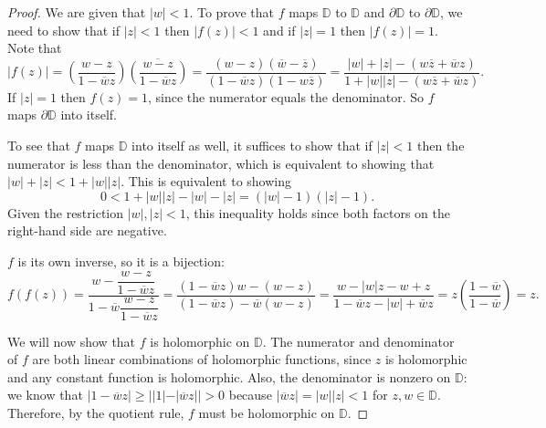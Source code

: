 \documentclass[10pt]{article}
\newcommand{\D}{\mathbb{D}}
\renewcommand{\bar}{\overline}
\begin{document}
\begin{proof}
We are given that $|w| < 1$.  To prove that $f$ maps $\D$ to $\D$ and $\partial \D$ to $\partial \D$, we need to show that if $|z| < 1$ then $|f(z)| < 1$ and if $|z| = 1$ then $|f(z)|=1$.  Note that
$$
|f(z)|
=
\left( \frac{w-z}{1-\bar{w}z} \right) \bar{\left(\frac{w-z}{1-\bar{w}z}\right)}
=
\frac{(w-z)(\bar{w} - \bar{z})}{(1-\bar{w}z)(1-w\bar{z})} = \frac{|w| + |z| - (w\bar{z} + \bar{w}z)}{1 + |w||z| - (w\bar{z} + \bar{w}z)}.
$$
If $|z| = 1$ then $f(z) = 1$, since the numerator equals the denominator.  So $f$ maps $\partial \D$ into itself.

To see that $f$ maps $\D$ into itself as well, it suffices to show that if $|z| < 1$ then the numerator is less than the denominator, which is equivalent to showing that $|w| + |z| < 1 + |w||z|$.  This is equivalent to showing
$$
0 < 1 + |w||z| - |w| - |z| = (|w| - 1)(|z|-1).
$$
Given the restriction $|w|, |z| < 1$, this inequality holds since both factors on the right-hand side are negative.

$f$ is its own inverse, so it is a bijection:
$$
f(f(z))
=
\frac{w - \dfrac{w-z}{1-\bar{w}z}}{1 - \bar{w}\dfrac{w-z}{1-\bar{w}z}}
= \frac{(1 - \bar{w}z)w - (w-z)}{(1-\bar{w}z) - \bar{w}(w-z)}
= \frac{w - |w|z - w + z}{1 - \bar{w}z - |w| + \bar{w}z}
= z \left( \frac{1 - \bar{w}}{1 - \bar{w}} \right)
= z.
$$

We will now show that $f$ is holomorphic on $\D$.  The numerator and denominator of $f$ are both linear combinations of holomorphic functions, since $z$ is holomorphic and any constant function is holomorphic.  Also, the denominator is nonzero on $\D$: we know that $|1 - \bar{w}z| \geq ||1| - |\bar{w}z|| > 0$ because $|\bar{w}z| = |w||z| < 1$ for $z,w \in \D$.  Therefore, by the quotient rule, $f$ must be holomorphic on $\D$.
\end{proof}
\end{document}
